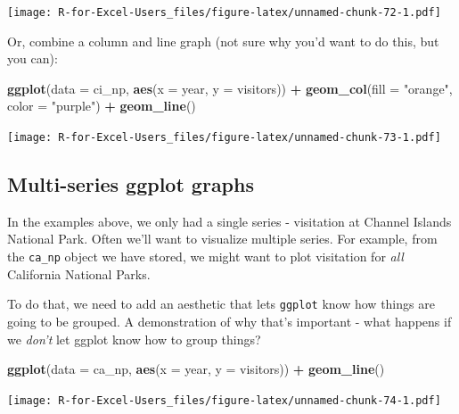 \documentclass[]{book}
\newenvironment{Shaded}{\begin{snugshade}}{\end{snugshade}}
\newcommand{\DataTypeTok}[1]{\textcolor[rgb]{0.13,0.29,0.53}{#1}}
\newcommand{\KeywordTok}[1]{\textcolor[rgb]{0.13,0.29,0.53}{\textbf{#1}}}
\newcommand{\NormalTok}[1]{#1}
\newcommand{\OperatorTok}[1]{\textcolor[rgb]{0.81,0.36,0.00}{\textbf{#1}}}
\newcommand{\StringTok}[1]{\textcolor[rgb]{0.31,0.60,0.02}{#1}}
\begin{document}
\texttt{[image: R-for-Excel-Users\_files/figure-latex/unnamed-chunk-72-1.pdf]}

Or, combine a column and line graph (not sure why you'd want to do this, but you can):

\begin{Shaded}
\begin{Highlighting}[]
\KeywordTok{ggplot}\NormalTok{(}\DataTypeTok{data =}\NormalTok{ ci_np, }\KeywordTok{aes}\NormalTok{(}\DataTypeTok{x =}\NormalTok{ year, }\DataTypeTok{y =}\NormalTok{ visitors)) }\OperatorTok{+}
\StringTok{  }\KeywordTok{geom_col}\NormalTok{(}\DataTypeTok{fill =} \StringTok{"orange"}\NormalTok{,}
           \DataTypeTok{color =} \StringTok{"purple"}\NormalTok{) }\OperatorTok{+}
\StringTok{  }\KeywordTok{geom_line}\NormalTok{()}
\end{Highlighting}
\end{Shaded}

\texttt{[image: R-for-Excel-Users\_files/figure-latex/unnamed-chunk-73-1.pdf]}

\hypertarget{multi-series-ggplot-graphs}{%
\subsection{Multi-series ggplot graphs}\label{multi-series-ggplot-graphs}}

In the examples above, we only had a single series - visitation at Channel Islands National Park. Often we'll want to visualize multiple series. For example, from the \texttt{ca\_np} object we have stored, we might want to plot visitation for \emph{all} California National Parks.

To do that, we need to add an aesthetic that lets \texttt{ggplot} know how things are going to be grouped. A demonstration of why that's important - what happens if we \emph{don't} let ggplot know how to group things?

\begin{Shaded}
\begin{Highlighting}[]
\KeywordTok{ggplot}\NormalTok{(}\DataTypeTok{data =}\NormalTok{ ca_np, }\KeywordTok{aes}\NormalTok{(}\DataTypeTok{x =}\NormalTok{ year, }\DataTypeTok{y =}\NormalTok{ visitors)) }\OperatorTok{+}
\StringTok{  }\KeywordTok{geom_line}\NormalTok{()}
\end{Highlighting}
\end{Shaded}

\texttt{[image: R-for-Excel-Users\_files/figure-latex/unnamed-chunk-74-1.pdf]}
\end{document}

